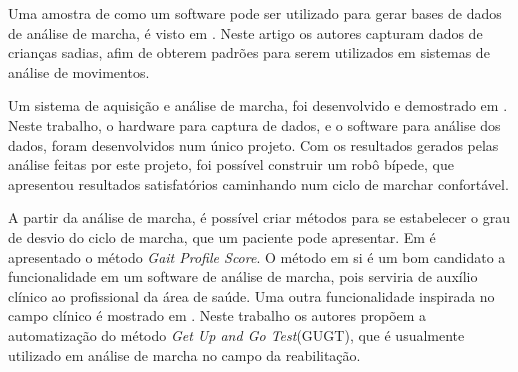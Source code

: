 Uma amostra de como um software pode ser utilizado para gerar bases de dados de análise de marcha, é visto em \cite{Moreno2009}. Neste artigo os autores capturam dados de crianças sadias, afim de obterem padrões para serem utilizados em sistemas de análise de movimentos.

Um sistema de aquisição e análise de marcha, foi desenvolvido e demostrado em \cite{Ferreira2009}. 
Neste trabalho, o hardware para captura de dados, e o software para análise dos dados, foram desenvolvidos num único projeto.
Com os resultados gerados pelas análise feitas por este projeto, foi possível construir um robô bípede, que apresentou resultados satisfatórios caminhando num ciclo de marchar confortável.

A partir da análise de marcha, é possível criar métodos para se estabelecer o grau de desvio do ciclo de marcha, que um paciente pode apresentar.
Em \cite{Beynon2010} é apresentado o método \emph{Gait Profile Score}.
O método em si é um bom candidato a funcionalidade em um software de análise de marcha, pois serviria de auxílio clínico ao profissional da área de saúde.
Uma outra funcionalidade inspirada no campo clínico é mostrado em \cite{Cippitelli2015}. Neste trabalho os autores 
propõem a automatização do método \emph{Get Up and Go Test}(GUGT), que é usualmente utilizado em análise de marcha no campo da reabilitação.


 
